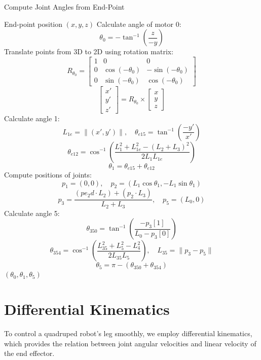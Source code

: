 \documentclass[a4paper,11pt]{article}
\begin{document}
\begin{algorithm}[H]
	\caption{Compute Joint Angles from End-Point}
	\begin{algorithmic}[1]
			\Require End-point position $(x, y, z)$
			\State Calculate angle of motor 0:
			$$
				\theta_0 = -\tan^{-1} \left( \frac{z}{-y} \right)
			$$
			\State Translate points from 3D to 2D using rotation matrix:
			$$
				R_{\theta_0} =
					\begin{bmatrix}
							1 & 0 & 0 \\
							0 & \cos(-\theta_0) & -\sin(-\theta_0) \\
							0 & \sin(-\theta_0) & \cos(-\theta_0)
					\end{bmatrix}
			$$
			$$
				\begin{bmatrix} x' \\ y' \\ z' \end{bmatrix} = R_{\theta_0} \times \begin{bmatrix} x \\ y \\ z \end{bmatrix}
			$$
			\State Calculate angle 1:
			$$
					L_{1e} = \| (x', y') \|, \quad
					\theta_{e15} = \tan^{-1} \left( \frac{-y'}{x'} \right)
			$$
			$$
					\theta_{e12} = \cos^{-1} \left( \frac{L_1^2 + L_{1e}^2 - (L_2 + L_3)^2}{2 L_1 L_{1e}} \right)
			$$
			$$
					\theta_1 = \theta_{e15} + \theta_{e12}
			$$
			\State Compute positions of joints:
			$$
					p_1 = (0, 0), \quad
					p_2 = (L_1 \cos \theta_1, -L_1 \sin \theta_1)
			$$
			$$
					p_3 = \frac{(pe_2d \cdot L_2) + (p_2 \cdot L_3)}{L_2 + L_3}, \quad
					p_5 = (L_0, 0)
			$$
			\State Calculate angle 5:
			$$
				\theta_{350} = \tan^{-1} \left( \frac{-p_3[1]}{L_0 - p_3[0]} \right)
			$$
			$$
					\theta_{354} = \cos^{-1} \left( \frac{L_{35}^2 + L_5^2 - L_4^2}{2 L_{35} L_5} \right), \quad
					L_{35} = \| p_3 - p_5 \|
			$$
			$$
					\theta_5 = \pi - (\theta_{350} + \theta_{354})
			$$
			\State \Return $(\theta_0, \theta_1, \theta_5)$
	\end{algorithmic}
\end{algorithm}

\section*{Differential Kinematics}

To control a quadruped robot's leg smoothly, we employ differential kinematics, which provides the relation between joint angular velocities and linear velocity of the end effector.
\end{document}
